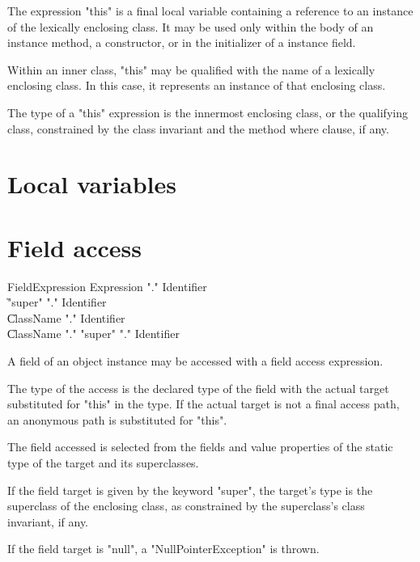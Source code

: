 The expression \xcd"this" is a final local variable containing a reference
to an instance of the lexically enclosing class.
It may be used only within the body of an instance method, a
constructor, or in the initializer of a instance field.

Within an inner class, \xcd"this" may be qualified with the
name of a lexically enclosing class.  In this case, it
represents an instance of that enclosing class.

The type of a \xcd"this" expression is the
innermost enclosing class, or the qualifying class,
constrained by the class invariant and the
method where clause, if any.

\section{Local variables}



\section{Field access}
\label{FieldAccess}


\begin{grammar}
FieldExpression \: Expression \xcd"." Identifier \\
                \| \xcd"super" \xcd"." Identifier \\
                \| ClassName \xcd"." Identifier \\
                \| ClassName \xcd"." \xcd"super" \xcd"." Identifier \\
\end{grammar}

A field of an object instance may be  accessed
with a field access expression.

The type of the access is the declared type of the field with the
actual target substituted for \xcd"this" in the type.  If the actual
target is not a final access path, an anonymous path is
substituted for \xcd"this".

The field accessed is selected from the fields and value properties
of the static type of the target and its superclasses.

If the field target is given by the keyword \xcd"super",
the target's type is
the superclass of the enclosing class, as
constrained by the superclass's class invariant, if any.

If the field target is \xcd"null", a \xcd"NullPointerException"
is thrown.

